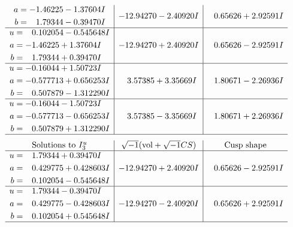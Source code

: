 \documentclass[1p]{elsarticle_modified}
\theoremstyle{definition}
\newcommand{\I}{\sqrt{-1}}
\begin{document}
$$\begin{array}{c|c|c}
\begin{aligned}
a &= -1.46225 - 1.37604 I \\
b &= \phantom{-}1.79344 - 0.39470 I\end{aligned}
 & -12.94270 - 2.40920 I & \phantom{-}0.65626 + 2.92591 I \\ \hline\begin{aligned}
u &= \phantom{-}0.102054 - 0.545648 I \\
a &= -1.46225 + 1.37604 I \\
b &= \phantom{-}1.79344 + 0.39470 I\end{aligned}
 & -12.94270 + 2.40920 I & \phantom{-}0.65626 - 2.92591 I \\ \hline\begin{aligned}
u &= -0.16044 + 1.50723 I \\
a &= -0.577713 + 0.656253 I \\
b &= \phantom{-}0.507879 - 1.312290 I\end{aligned}
 & \phantom{-}3.57385 + 3.35669 I & \phantom{-}1.80671 - 2.26936 I \\ \hline\begin{aligned}
u &= -0.16044 - 1.50723 I \\
a &= -0.577713 - 0.656253 I \\
b &= \phantom{-}0.507879 + 1.312290 I\end{aligned}
 & \phantom{-}3.57385 - 3.35669 I & \phantom{-}1.80671 + 2.26936 I\\
 \hline 
 \end{array}$$\newpage$$\begin{array}{c|c|c}  
\text{Solutions to }I^u_{3}& \I (\text{vol} + \sqrt{-1}CS) & \text{Cusp shape}\\
 \hline 
\begin{aligned}
u &= \phantom{-}1.79344 + 0.39470 I \\
a &= \phantom{-}0.429775 + 0.428603 I \\
b &= \phantom{-}0.102054 - 0.545648 I\end{aligned}
 & -12.94270 + 2.40920 I & \phantom{-}0.65626 - 2.92591 I \\ \hline\begin{aligned}
u &= \phantom{-}1.79344 - 0.39470 I \\
a &= \phantom{-}0.429775 - 0.428603 I \\
b &= \phantom{-}0.102054 + 0.545648 I\end{aligned}
 & -12.94270 - 2.40920 I & \phantom{-}0.65626 + 2.92591 I\\
 \hline 
 \end{array}$$\newpage\newpage\renewcommand{\arraystretch}{1}
\end{document}
